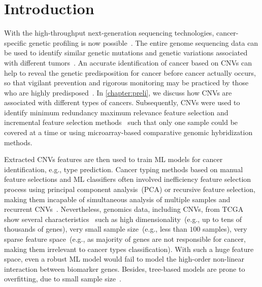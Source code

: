 \section{Introduction}
With the high-throughput next-generation sequencing technologies, cancer-specific genetic profiling is now possible~\cite{tomczak2015cancer,tcga}. The entire genome sequencing data can be used to identify similar genetic mutations and genetic variations associated with different tumors~\cite{82Tomczak}. An accurate identification of cancer based on CNVs can help to reveal the genetic predisposition for cancer before cancer actually occurs, so that vigilant prevention and rigorous monitoring may be practiced by those who are highly predisposed~\cite{19Cruz}. In \cref{chapter:preli}, we discuss how CNVs are associated with different types of cancers. Subsequently, CNVs were used to identify minimum redundancy maximum relevance feature selection and incremental feature selection methods~\cite{zhang2016classification} such that only one sample could be covered at a time or using microarray-based comparative genomic hybridization methods. 

\hspace*{3.5mm} Extracted CNVs features are then used to train ML models for cancer identification, e.g., type prediction. Cancer typing methods based on manual feature selections and ML classifiers often involved inefficiency feature selection process using principal component analysis~(PCA) or recursive feature selection, making them incapable of simultaneous analysis of multiple samples and recurrent CNVs~\cite{malekpour2018mseq}. Nevertheless, genomics data, including CNVs, from TCGA show several characteristics~\cite{lu2003cancer} such as high dimensionality~(e.g., up to tens of thousands of genes), very small sample size~(e.g., less than $100$ samples), very sparse feature space~(e.g., as majority of genes are not responsible for cancer, making them irrelevant to cancer types classification).
With such a huge feature space, even a robust ML model would fail to model the high-order non-linear interaction between biomarker genes. Besides, tree-based models are prone to overfitting, due to small sample size~\cite{lu2003cancer}. 

